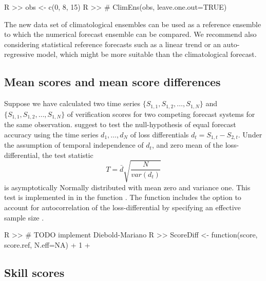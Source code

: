 \documentclass[article]{jss}
\begin{document}
\begin{Schunk}
\begin{Sinput}
R >> obs <- c(0, 8, 15)
R >> # ClimEns(obs, leave.one.out=TRUE)
\end{Sinput}
\end{Schunk}

The new data set of climatological ensembles can be used as a reference ensemble to which the numerical forecast ensemble can be compared.
We recommend also considering statistical reference forecasts such as a linear trend or an auto-regressive model, which might be more suitable than the climatological forecast.



\subsection{Mean scores and mean score differences}

Suppose we have calculated two time series $\{S_{1,1}, S_{1,2}, \dots, S_{1,N}\}$ and $\{S_{1,1}, S_{1,2}, \dots, S_{1,N}\}$ of verification scores for two competing forecast systems for the same observation.
\citet{diebold1995comparing} suggest to test the null-hypothesis of equal forecast accuracy using the time series $d_1, \dots, d_N$ of loss differentials $d_t = S_{1,t} - S_{2,t}$. 
Under the assumption of temporal independence of $d_t$, and zero mean of the loss-differential, the test statistic 
%
\begin{equation}
T = \bar{d}\sqrt{\frac{N}{var(d_t)}}
\end{equation}
%
is asymptotically Normally distributed with mean zero and variance one.
This test is implemented in  in the function .
The function includes the option to account for autocorrelation of the loss-differential by specifying an effective sample size .

\begin{Schunk}
\begin{Sinput}
R >> # TODO implement Diebold-Mariano
R >> ScoreDiff <- function(score, score.ref, N.eff=NA) {
+   1
+ }
\end{Sinput}
\end{Schunk}



\subsection{Skill scores}
\end{document}

